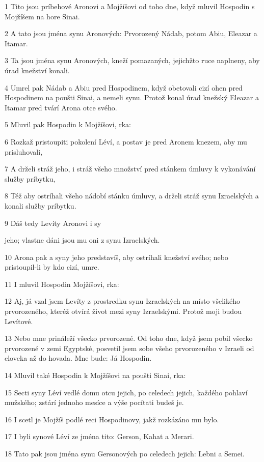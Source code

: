 \par 1 Tito jsou príbehové Aronovi a Mojžíšovi od toho dne, když mluvil Hospodin s Mojžíšem na hore Sinai.
\par 2 A tato jsou jména synu Aronových: Prvorozený Nádab, potom Abiu, Eleazar a Itamar.
\par 3 Ta jsou jména synu Aronových, kneží pomazaných, jejichžto ruce naplneny, aby úrad knežství konali.
\par 4 Umrel pak Nádab a Abiu pred Hospodinem, když obetovali cizí ohen pred Hospodinem na poušti Sinai, a nemeli synu. Protož konal úrad knežský Eleazar a Itamar pred tvárí Arona otce svého.
\par 5 Mluvil pak Hospodin k Mojžíšovi, rka:
\par 6 Rozkaž pristoupiti pokolení Léví, a postav je pred Aronem knezem, aby mu prisluhovali,
\par 7 A drželi stráž jeho, i stráž všeho množství pred stánkem úmluvy k vykonávání služby príbytku,
\par 8 Též aby ostríhali všeho nádobí stánku úmluvy, a drželi stráž synu Izraelských a konali služby príbytku.
\par 9 Dáš tedy Levíty Aronovi i sy\par jeho; vlastne dáni jsou mu oni z synu Izraelských.
\par 10 Arona pak a syny jeho predstavíš, aby ostríhali knežství svého; nebo pristoupil-li by kdo cizí, umre.
\par 11 I mluvil Hospodin Mojžíšovi, rka:
\par 12 Aj, já vzal jsem Levíty z prostredku synu Izraelských na místo všelikého prvorozeného, kteréž otvírá život mezi syny Izraelskými. Protož moji budou Levítové.
\par 13 Nebo mne prináleží všecko prvorozené. Od toho dne, když jsem pobil všecko prvorozené v zemi Egyptské, posvetil jsem sobe všeho prvorozeného v Izraeli od cloveka až do hovada. Mne bude: Já Hospodin.
\par 14 Mluvil také Hospodin k Mojžíšovi na poušti Sinai, rka:
\par 15 Secti syny Léví vedlé domu otcu jejich, po celedech jejich, každého pohlaví mužského; zstárí jednoho mesíce a výše pocítati budeš je.
\par 16 I scetl je Mojžíš podlé reci Hospodinovy, jakž rozkázáno mu bylo.
\par 17 I byli synové Léví ze jména tito: Gerson, Kahat a Merari.
\par 18 Tato pak jsou jména synu Gersonových po celedech jejich: Lebni a Semei.
